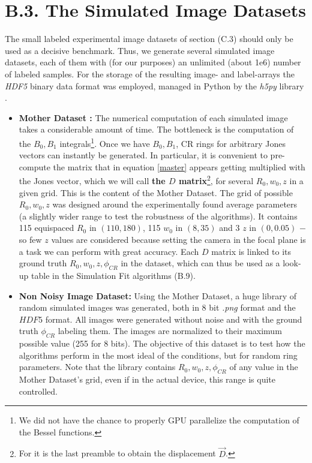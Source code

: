 \documentclass[11pt, a4paper, twoside]{article} %
\begin{document}
\section*{B.3. The Simulated Image Datasets }
The small labeled experimental image datasets of section (C.3) should only be used as a decisive benchmark. Thus, we generate several simulated image datasets, each of them with (for our purposes) an unlimited (about 1e6) number of labeled samples. For the storage of the resulting image- and label-arrays the {\em HDF5} binary data format was employed, managed in Python by the {\em h5py} library \cite{h5f}.\vspace{-0.1cm}
\begin{itemize}
\item {\bf Mother Dataset :} The numerical computation of each simulated image takes a considerable amount of time. The bottleneck is the computation of the $B_0,B_1$ integrals\footnote{We did not have the chance to properly GPU parallelize the computation of the Bessel functions.}. Once we have $B_0,B_1$, CR rings for arbitrary Jones vectors can instantly be generated. In particular, it is convenient to pre-compute the matrix that in equation \eqref{master} appears getting multiplied with the Jones vector, which we will call {\bf the $D$ matrix}\footnote{For it is the last preamble to obtain the displacement $\vec{D}$.}, for several $R_0,w_0,z$ in a given grid. This is the content of the Mother Dataset. The grid of possible $R_0,w_0,z$ was designed around the experimentally found average parameters (a slightly wider range to test the robustness of the algorithms). It contains 115 equispaced $R_0$ in $(110,180)$, 115 $w_0$ in $(8,35)$ and 3 $z$ in $(0,0.05)$ $-$ so few $z$ values are considered because setting the camera in the focal plane is a task we can perform with great accuracy. Each $D$ matrix is linked to its ground truth $R_0,w_0,z,\phi_{CR}$ in the dataset, which can thus be used as a look-up table in the Simulation Fit algorithms (B.9).

\item {\bf Non Noisy Image Dataset:} Using the Mother Dataset, a huge library of random simulated images was generated, both in 8 bit {\em .png} format and the $HDF5$ format. All images were generated without noise and with the ground truth $\phi_{CR}$ labeling them. The images are normalized to their maximum possible value (255 for 8 bits). The objective of this dataset is to test how the algorithms perform in the most ideal of the conditions, but for random ring parameters. Note that the library contains $R_0,w_0,z,\phi_{CR}$ of any value in the Mother Dataset's grid, even if in the actual device, this range is quite controlled. 


\end{itemize}
\end{document}
